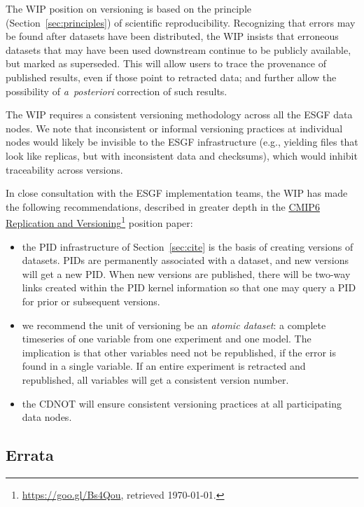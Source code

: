 \documentclass[gmd,manuscript]{copernicus}
\newcommand{\urlref}[2] {\href{#1}{#2}\footnote{\url{#1}, retrieved \today.}}
\begin{document}
The WIP position on versioning is based on the principle
(Section~\ref{sec:principles}) of scientific reproducibility. Recognizing that
errors may be found after datasets have been distributed, the WIP
insists that erroneous datasets that may have been used downstream
continue to be publicly available, but marked as superseded. This will
allow users to trace the provenance of published results, even if
those point to retracted data; and further allow the possibility of
\emph{a~posteriori} correction of such results.

The WIP requires a consistent versioning methodology across all the
ESGF data nodes. We note that inconsistent or informal versioning
practices at individual nodes would likely be invisible to the ESGF
infrastructure (e.g., yielding files that look like replicas, but with
inconsistent data and checksums), which would inhibit traceability
across versions.

In close consultation with the ESGF implementation teams, the WIP has
made the following recommendations, described in greater depth in the
\urlref{https://goo.gl/Bs4Qou}{CMIP6 Replication and Versioning}
position paper:

\begin{itemize}
\item the PID infrastructure of Section~\ref{sec:cite} is the basis of creating
  versions of datasets. PIDs are permanently associated with a
  dataset, and new versions will get a new PID. When new versions are
  published, there will be two-way links created within the PID kernel
  information so that one may query a PID for prior or subsequent
  versions.
\item we recommend the unit of versioning be an \emph{atomic dataset}:
  a complete timeseries of one variable from one experiment and one
  model. The implication is that other variables need not be
  republished, if the error is found in a single variable. If an entire
  experiment is retracted and republished, all variables will get a
  consistent version number.
\item the CDNOT will ensure consistent versioning practices at all
  participating data nodes.
\end{itemize}

\subsection{Errata}
\label{sec:errata}
\end{document}

